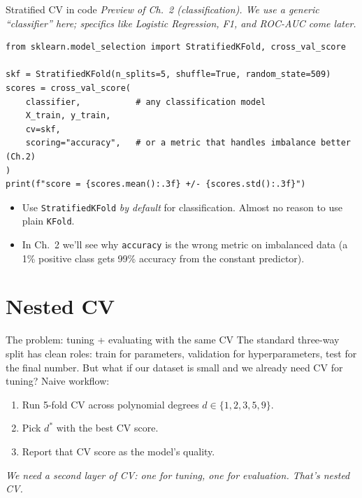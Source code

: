 \documentclass[aspectratio=169]{beamer}
\begin{document}
\begin{frame}[fragile]{Stratified CV in code}
  \footnotesize \emph{Preview of Ch.\ 2 (classification). We use a generic ``classifier'' here; specifics like Logistic Regression, F1, and ROC-AUC come later.}
  \vskip 2pt
\begin{lstlisting}
from sklearn.model_selection import StratifiedKFold, cross_val_score

skf = StratifiedKFold(n_splits=5, shuffle=True, random_state=509)
scores = cross_val_score(
    classifier,           # any classification model
    X_train, y_train,
    cv=skf,
    scoring="accuracy",   # or a metric that handles imbalance better (Ch.2)
)
print(f"score = {scores.mean():.3f} +/- {scores.std():.3f}")
\end{lstlisting}
  \vfill
  \begin{itemize}\small
    \item Use \texttt{StratifiedKFold} \emph{by default} for classification. Almost no reason to use plain \texttt{KFold}.
    \item In Ch.\ 2 we'll see why \texttt{accuracy} is the wrong metric on imbalanced data (a 1\% positive class gets 99\% accuracy from the constant predictor).
  \end{itemize}
\end{frame}


\section{Nested CV}

\begin{frame}{The problem: tuning + evaluating with the same CV}
  The standard three-way split has clean roles: train for parameters, validation for hyperparameters, test for the final number.
  \vfill
  But what if our dataset is small and we already need CV for tuning? Naive workflow:
  \begin{enumerate}\small
    \item Run 5-fold CV across polynomial degrees $d \in \{1, 2, 3, 5, 9\}$.
    \item Pick $d^*$ with the best CV score.
    \item Report that CV score as the model's quality.
  \end{enumerate}
  \vfill
  \vfill
  \footnotesize \emph{We need a second layer of CV: one for tuning, one for evaluation. That's nested CV.}
\end{frame}
\end{document}
